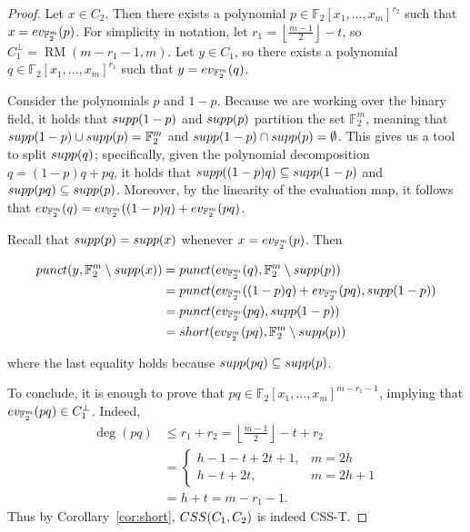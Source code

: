 \documentclass[10pt,a4paper]{amsart}
\DeclareMathOperator{\RM}{RM}
\newcommand{\CSS}{\textnormal{CSS}}
\newcommand{\F}{{\mathbb{F}}}
\newcommand{\ev}{\textnormal{ev}_{\F_2^m}}
\newcommand{\floor}[1]{\left\lfloor#1\right\rfloor}
\newcommand{\polyring}[1]{\F_2[x_1,\dots,x_m]^{#1}}
\newcommand{\punct}{\textnormal{punct}}
\newcommand{\short}{\textnormal{short}}
\newcommand{\supp}{\textnormal{supp}}
\begin{document}
\begin{proof}
Let $x\in C_2$. Then there exists a polynomial $p\in \polyring{r_2}$ such that $x=\ev(p)$. For simplicity in notation, let $r_1=\floor{\frac{m-1}{2}} - t$, so $C_1^\perp=\RM(m-r_1-1,m)$. Let $y\in C_1$, so there exists a polynomial $q\in \polyring{r_1}$ such that $y=\ev(q)$. 

Consider the polynomials $p$ and $1-p$. Because we are working over the binary field, it holds that $\supp(1-p)$ and $\supp(p)$ partition the set $\F_2^m$, meaning that $\supp(1-p)\cup \supp(p)=\F_2^m$ and $\supp(1-p)\cap \supp(p)=\emptyset$. This gives us a tool to split $\supp(q)$; specifically, given the polynomial decomposition $q=(1-p)q+pq$, it holds that $\supp((1-p)q)\subseteq \supp(1-p)$ and $\supp(pq)\subseteq \supp(p)$. Moreover, by the linearity of the evaluation map, it follows that $\ev(q)=\ev((1-p)q)+\ev(pq)$. 

Recall that $\supp(p)=\supp(x)$ whenever $x=\ev(p)$. Then

\begin{align*}
    \punct(y,\F_2^m\setminus \supp(x))&= \punct(\ev(q),\F_2^m\setminus \supp(p))\\
    &= \punct(\ev((1-p)q)+\ev(pq),\supp(1-p))\\
    &= \punct(\ev(pq), \supp(1-p))\\&=\short(\ev(pq),\F_2^m\setminus \supp(p))
\end{align*}

where the last equality holds because $\supp(pq)\subseteq \supp(p)$.

To conclude, it is enough to prove that $pq\in\polyring{m-r_1-1}$, implying that $\ev(pq)\in C_1^\perp$. Indeed, 
\begin{align*}
    \deg(pq)&\leq r_1+r_2 = \floor{\frac{m-1}{2}} - t +r_2\\
    &=\begin{cases}
        h-1-t+2t+1, & m=2h \\ 
        h-t+2t, & m=2h+1
    \end{cases}\\
    &=h+t=m-r_1-1.
\end{align*}
Thus by Corollary~\ref{cor:short}, $\CSS(C_1,C_2)$ is indeed CSS-T.
\end{proof}
\end{document}
